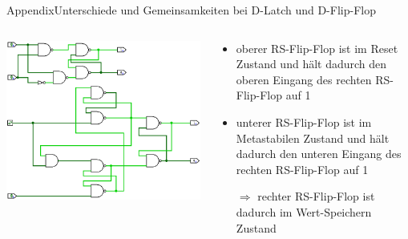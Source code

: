 \begin{frame}{Appendix}{Unterschiede und Gemeinsamkeiten bei D-Latch und D-Flip-Flop}
  \begin{columns}
    \begin{column}{0.4\textwidth}
      \includegraphics[width=0.6\paperheight, center]{./figures/001.png}
    \end{column}
    \begin{column}{0.6\textwidth}
      \begin{itemize}
        \item \alert{oberer RS-Flip-Flop} ist im \alert{Reset Zustand} und hält dadurch den oberen Eingang des \alert{rechten RS-Flip-Flop} auf \alert{1}
        \item \alert{unterer RS-Flip-Flop} ist im \alert{Metastabilen Zustand} und hält dadurch den unteren Eingang des \alert{rechten RS-Flip-Flop} auf \alert{1}
        \item[\textcolor{PrimaryColor}{$\Rightarrow$}] \alert{rechter RS-Flip-Flop} ist dadurch im \alert{Wert-Speichern Zustand}
      \end{itemize}
    \end{column}
  \end{columns}
\end{frame}
